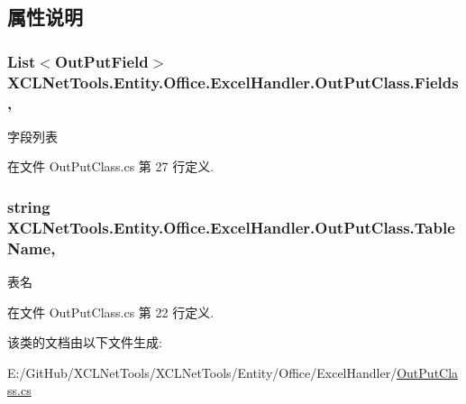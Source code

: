 \subsection{属性说明}
\subsubsection[{\texorpdfstring{Fields}{Fields}}]{\setlength{\rightskip}{0pt plus 5cm}List$<${\bf Out\+Put\+Field}$>$ X\+C\+L\+Net\+Tools.\+Entity.\+Office.\+Excel\+Handler.\+Out\+Put\+Class.\+Fields\hspace{0.3cm}{\ttfamily [get]}, {\ttfamily [set]}}\hypertarget{class_x_c_l_net_tools_1_1_entity_1_1_office_1_1_excel_handler_1_1_out_put_class_a3efddb66ca15bab7aa2b15f80d59fa06}{}\label{class_x_c_l_net_tools_1_1_entity_1_1_office_1_1_excel_handler_1_1_out_put_class_a3efddb66ca15bab7aa2b15f80d59fa06}


字段列表 



在文件 Out\+Put\+Class.\+cs 第 27 行定义.

\subsubsection[{\texorpdfstring{Table\+Name}{TableName}}]{\setlength{\rightskip}{0pt plus 5cm}string X\+C\+L\+Net\+Tools.\+Entity.\+Office.\+Excel\+Handler.\+Out\+Put\+Class.\+Table\+Name\hspace{0.3cm}{\ttfamily [get]}, {\ttfamily [set]}}\hypertarget{class_x_c_l_net_tools_1_1_entity_1_1_office_1_1_excel_handler_1_1_out_put_class_afdbc40e9ef162503cbf1ebea55728c59}{}\label{class_x_c_l_net_tools_1_1_entity_1_1_office_1_1_excel_handler_1_1_out_put_class_afdbc40e9ef162503cbf1ebea55728c59}


表名 



在文件 Out\+Put\+Class.\+cs 第 22 行定义.



该类的文档由以下文件生成\+:\begin{DoxyCompactItemize}
\item 
E\+:/\+Git\+Hub/\+X\+C\+L\+Net\+Tools/\+X\+C\+L\+Net\+Tools/\+Entity/\+Office/\+Excel\+Handler/\hyperlink{_out_put_class_8cs}{Out\+Put\+Class.\+cs}\end{DoxyCompactItemize}
